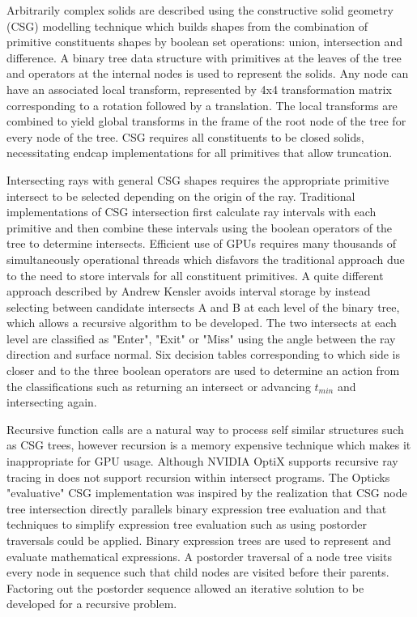 \documentclass{webofc}
\begin{document}
Arbitrarily complex solids are described using the constructive solid geometry (CSG) modelling technique 
which builds shapes from the combination of primitive constituents shapes by boolean set operations: union, intersection and difference.
A binary tree data structure with primitives at the leaves of the tree and operators at the internal nodes is used
to represent the solids. Any node can have an associated local transform, represented by 4x4 transformation matrix corresponding 
to a rotation followed by a translation. The local transforms are combined to yield global transforms in the frame of the root node of the tree
for every node of the tree. CSG requires all constituents to be closed solids, necessitating 
endcap implementations for all primitives that allow truncation. 

Intersecting rays with general CSG shapes requires the appropriate primitive intersect to be 
selected depending on the origin of the ray. Traditional implementations of CSG intersection first calculate 
ray intervals with each primitive and then combine these intervals using the boolean operators of the tree to determine intersects.  
Efficient use of GPUs requires many thousands of simultaneously operational threads which disfavors the traditional approach due to 
the need to store intervals for all constituent primitives.  A quite different approach
described by Andrew Kensler\cite{kensler} avoids interval storage by instead selecting between 
candidate intersects A and B at each level of the binary tree, which allows a recursive algorithm 
to be developed. The two intersects at each level are classified as "Enter", "Exit" or "Miss" 
using the angle between the ray direction and surface normal. Six decision tables corresponding to which side is closer and 
to the three boolean operators are used to determine an action from the classifications such as returning an intersect 
or advancing $t_{min}$ and intersecting again. 

Recursive function calls are a natural way to process self similar structures such as CSG trees,  
however recursion is a memory expensive technique which makes it inappropriate for GPU usage.
Although NVIDIA OptiX supports recursive ray tracing in does not support recursion within intersect programs. 
The Opticks "evaluative" CSG implementation was inspired by the realization that CSG node tree intersection 
directly parallels binary expression tree evaluation and that techniques to simplify expression 
tree evaluation such as using postorder traversals could be applied. 
Binary expression trees are used to represent and evaluate mathematical expressions. 
A postorder traversal of a node tree visits every node in sequence such that
child nodes are visited before their parents.
Factoring out the postorder sequence allowed an iterative solution to be developed 
for a recursive problem.  
\end{document}
